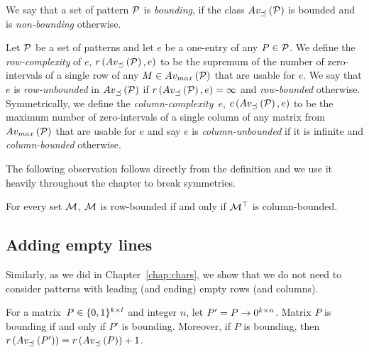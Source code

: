 \begin{defn}
We say that a set of pattern $\mathcal{P}$ is \emph{bounding}, if the class $Av_{\preceq}\left(\mathcal{P}\right)$ is bounded and is \emph{non-bounding} otherwise.
\end{defn}

\begin{defn}
Let $\mathcal{P}$ be a set of patterns and let $e$ be a one-entry of any $P\in\mathcal{P}$. We define the \emph{row-complexity} of $e$, $r\left(Av_{\preceq}\left(\mathcal{P}\right),e\right)$ to be the supremum of the number of zero-intervals of a single row of any $M\in Av_{max}\left(\mathcal{P}\right)$ that are usable for $e$. We say that $e$ is \emph{row-unbounded} in $Av_{\preceq}\left(\mathcal{P}\right)$ if $r\left(Av_{\preceq}\left(\mathcal{P}\right),e\right)=\infty$ and \emph{row-bounded} otherwise. Symmetrically, we define the \emph{column-complexity}~$e$, $c\left(Av_{\preceq}\left(\mathcal{P}\right),e\right)$ to be the maximum number of zero-intervals of a single column of any matrix from $Av_{max}\left(\mathcal{P}\right)$ that are usable for $e$ and say $e$ is \emph{column-unbounded} if it is infinite and \emph{column-bounded} otherwise.
\end{defn}

The following observation follows directly from the definition and we use it heavily throughout the chapter to break symmetries.

\begin{obs}
\label{obs:transposebounded}
For every set $\mathcal{M}$, $\mathcal{M}$ is row-bounded if and only if $\mathcal{M}^\top$ is column-bounded.
\end{obs}

\subsection{Adding empty lines}

Similarly, as we did in Chapter~\ref{chap:chars}, we show that we do not need to consider patterns with leading (and ending) empty rows (and columns).

\begin{obs}
For a matrix~$P\in\{0,1\}^{k\times l}$ and integer $n$, let $P'=P\rightarrow0^{k\times n}$. Matrix $P$ is bounding if and only if $P'$ is bounding. Moreover, if $P$ is bounding, then $r\left(Av_{\preceq}\left(P'\right)\right)=r\left(Av_{\preceq}\left(P\right)\right)+1$.
\end{obs}

